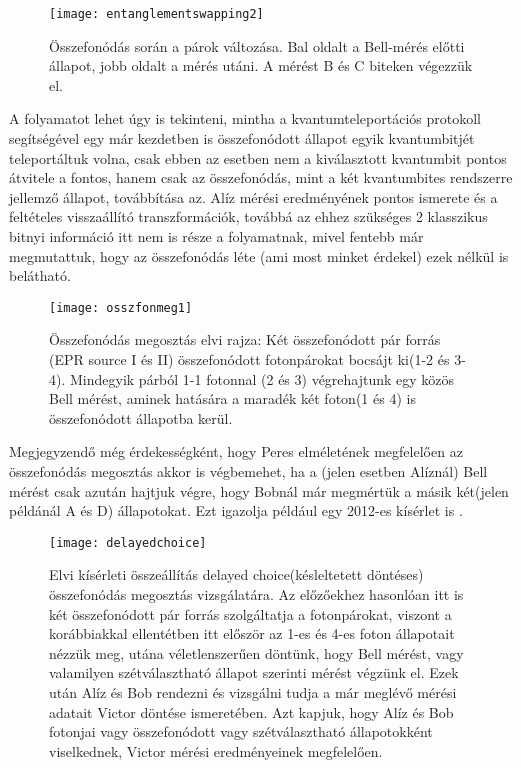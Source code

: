\begin{figure}[H]
\centering
\texttt{[image: entanglementswapping2]}
\caption[Összefonódás megosztás]{Összefonódás során a párok változása. Bal oldalt a Bell-mérés előtti állapot, jobb oldalt a mérés utáni. A mérést B és C biteken végezzük el.}
\end{figure}
A folyamatot lehet úgy is tekinteni, mintha a kvantumteleportációs protokoll \cite{bennett1993teleporting} segítségével egy már kezdetben is összefonódott állapot egyik kvantumbitjét teleportáltuk volna, csak ebben az esetben nem a kiválasztott kvantumbit pontos átvitele a fontos, hanem csak az összefonódás, mint a két kvantumbites rendszerre jellemző állapot, továbbítása az. Alíz mérési eredményének pontos ismerete és a feltételes visszaállító transzformációk, továbbá az ehhez szükséges 2 klasszikus bitnyi információ itt nem is része  a folyamatnak, mivel fentebb már megmutattuk, hogy az összefonódás léte (ami most minket érdekel) ezek nélkül is belátható.
\\
\begin{figure}[H]
\centering
\texttt{[image: osszfonmeg1]}
\caption[Összefonódás megosztás elvi rajza]{Összefonódás megosztás elvi rajza: Két összefonódott pár forrás (EPR source I és II) összefonódott fotonpárokat bocsájt ki(1-2 és 3-4). Mindegyik párból 1-1 fotonnal (2 és 3) végrehajtunk egy közös Bell mérést, aminek hatására a maradék két foton(1 és 4) is összefonódott állapotba kerül.}
\end{figure}
Megjegyzendő még érdekességként, hogy Peres elméletének megfelelően \cite{peres2000delayed} az összefonódás megosztás akkor is végbemehet, ha a (jelen esetben Alíznál) Bell mérést csak azután hajtjuk végre, hogy Bobnál már megmértük a másik két(jelen példánál A és D) állapotokat. Ezt igazolja például egy 2012-es kísérlet is \cite{ma2012experimental}.
\\
\begin{figure}[H]
\centering
\texttt{[image: delayedchoice]}
\caption[Késleltetett összefonódás megosztás kísérlet]{Elvi kísérleti összeállítás delayed choice(késleltetett döntéses) összefonódás megosztás vizsgálatára. Az előzőekhez hasonlóan itt is két összefonódott pár forrás szolgáltatja a fotonpárokat, viszont a korábbiakkal ellentétben itt először az 1-es és 4-es foton állapotait nézzük meg, utána véletlenszerűen döntünk, hogy Bell mérést, vagy valamilyen szétválasztható állapot szerinti mérést végzünk el. Ezek után Alíz és Bob rendezni és vizsgálni tudja a már meglévő mérési adatait Victor döntése ismeretében. Azt kapjuk, hogy Alíz és Bob fotonjai vagy összefonódott vagy szétválasztható állapotokként viselkednek, Victor mérési eredményeinek megfelelően.}
\end{figure}


